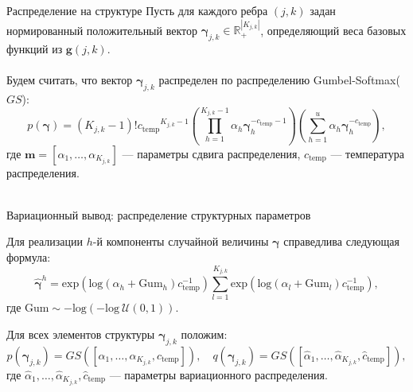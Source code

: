 \documentclass[usenames,dvipsnames,11pt,pdf,utf8,russian,aspectratio=169]{beamer}
\begin{document}
\begin{frame}{ Распределение на структуре}
Пусть для каждого ребра $(j,k)$ задан нормированный положительный вектор $\boldsymbol{\gamma}_{j,k} \in \mathbb{R}_{+}^{|K_{j,k}|}$, определяющий веса базовых функций из  $\mathbf{g}(j,k)$.
\\~\\
Будем считать, что вектор $\boldsymbol{\gamma}_{j,k}$ распределен по распределению Gumbel-Softmax($GS$):
\[
    p(\boldsymbol{\gamma}) = (K_{j,k}-1)!{c_{\text{temp}}}^{K_{j,k}-1}\left(\prod_{h=1}^{K_{j,k}-1} \alpha_h \boldsymbol{\gamma}_h^{-c_{\text{temp}}-1}\right)\left(\sum_{h=1}^u\alpha_h\boldsymbol{\gamma}_h^{-c_{\text{temp}}}\right),
\] 
где $\mathbf{m} = [\alpha_1,\dots,\alpha_{K_{j,k}}]$ --- параметры сдвига распределения, $c_{\text{temp}}$ --- температура распределения. 
\\~\\

\end{frame}




\begin{frame}{Вариационный вывод: распределение структурных параметров}

Для реализации $h$-й компоненты случайной величины $\boldsymbol{\gamma}$ справедлива следующая формула:
\[
    \hat{\boldsymbol{\gamma}}^h = \text{exp}\left(\text{log}\left(\alpha_h + \text{Gum}_h\right)c_{\text{temp}}^{-1}\right) \sum_{l=1}^{K_{j,k}} \text{exp}\left(\text{log}\left(\alpha_l + \text{Gum}_l\right)c_{\text{temp}}^{-1}\right),
\]
где $\text{Gum} \sim -\text{log}(-\text{log}~\mathcal{U}(0,1)).$ 

Для всех элементов структуры $\boldsymbol{\gamma}_{j,k}$ положим:
\[
    p(\boldsymbol{\gamma}_{j,k}) = GS([\alpha_1, \dots, \alpha_{K_{j,k}}, c_{\text{temp}}]), \quad q(\boldsymbol{\gamma}_{j,k}) = GS([\hat{\alpha}_1, \dots, \hat{\alpha}_{K_{j,k}}, \hat{c}_{\text{temp}}]),
\]
где $\hat{\alpha}_1, \dots, \hat{\alpha}_{K_{j,k}}, \hat{c}_{\text{temp}}$ --- параметры вариационного распределения.
\end{frame}




    
\end{document}
